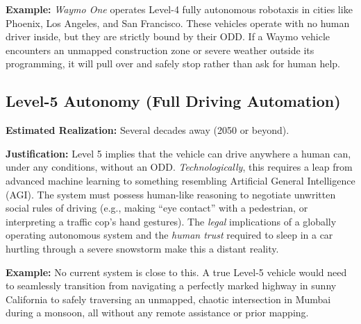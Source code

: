 \documentclass{article}
\begin{document}
\textbf{Example:} 
\textit{Waymo One} operates Level-4 fully autonomous robotaxis in cities like Phoenix, Los Angeles, and San Francisco. These vehicles operate with no human driver inside, but they are strictly bound by their ODD. If a Waymo vehicle encounters an unmapped construction zone or severe weather outside its programming, it will pull over and safely stop rather than ask for human help.

\subsection*{Level-5 Autonomy (Full Driving Automation)}
\textbf{Estimated Realization:} Several decades away (2050 or beyond).

\textbf{Justification:} 
Level 5 implies that the vehicle can drive anywhere a human can, under any conditions, without an ODD. \textit{Technologically}, this requires a leap from advanced machine learning to something resembling Artificial General Intelligence (AGI). The system must possess human-like reasoning to negotiate unwritten social rules of driving (e.g., making ``eye contact'' with a pedestrian, or interpreting a traffic cop's hand gestures). The \textit{legal} implications of a globally operating autonomous system and the \textit{human trust} required to sleep in a car hurtling through a severe snowstorm make this a distant reality.

\textbf{Example:} 
No current system is close to this. A true Level-5 vehicle would need to seamlessly transition from navigating a perfectly marked highway in sunny California to safely traversing an unmapped, chaotic intersection in Mumbai during a monsoon, all without any remote assistance or prior mapping.
\end{document}
